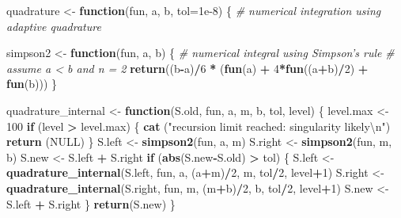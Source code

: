 \documentclass[]{book}
\newenvironment{Shaded}{\begin{snugshade}}{\end{snugshade}}
\newcommand{\KeywordTok}[1]{\textcolor[rgb]{0.13,0.29,0.53}{\textbf{#1}}}
\newcommand{\DataTypeTok}[1]{\textcolor[rgb]{0.13,0.29,0.53}{#1}}
\newcommand{\DecValTok}[1]{\textcolor[rgb]{0.00,0.00,0.81}{#1}}
\newcommand{\FloatTok}[1]{\textcolor[rgb]{0.00,0.00,0.81}{#1}}
\newcommand{\CharTok}[1]{\textcolor[rgb]{0.31,0.60,0.02}{#1}}
\newcommand{\StringTok}[1]{\textcolor[rgb]{0.31,0.60,0.02}{#1}}
\newcommand{\CommentTok}[1]{\textcolor[rgb]{0.56,0.35,0.01}{\textit{#1}}}
\newcommand{\OtherTok}[1]{\textcolor[rgb]{0.56,0.35,0.01}{#1}}
\newcommand{\ControlFlowTok}[1]{\textcolor[rgb]{0.13,0.29,0.53}{\textbf{#1}}}
\newcommand{\OperatorTok}[1]{\textcolor[rgb]{0.81,0.36,0.00}{\textbf{#1}}}
\newcommand{\NormalTok}[1]{#1}
\theoremstyle{definition}
\theoremstyle{definition}
\theoremstyle{definition}
\theoremstyle{remark}
\begin{document}
\begin{Shaded}
\begin{Highlighting}[]
\NormalTok{quadrature <-}\StringTok{ }\ControlFlowTok{function}\NormalTok{(fun, a, b, }\DataTypeTok{tol=}\FloatTok{1e-8}\NormalTok{) \{}
    \CommentTok{# numerical integration using adaptive quadrature}

\NormalTok{  simpson2 <-}\StringTok{ }\ControlFlowTok{function}\NormalTok{(fun, a, b) \{}
    \CommentTok{# numerical integral using Simpson's rule}
    \CommentTok{# assume a < b and n = 2}
    \KeywordTok{return}\NormalTok{((b}\OperatorTok{-}\NormalTok{a)}\OperatorTok{/}\DecValTok{6} \OperatorTok{*}\StringTok{ }\NormalTok{(}\KeywordTok{fun}\NormalTok{(a) }\OperatorTok{+}\StringTok{ }\DecValTok{4}\OperatorTok{*}\KeywordTok{fun}\NormalTok{((a}\OperatorTok{+}\NormalTok{b)}\OperatorTok{/}\DecValTok{2}\NormalTok{) }\OperatorTok{+}\StringTok{ }\KeywordTok{fun}\NormalTok{(b)))}
\NormalTok{  \}}
 
\NormalTok{    quadrature_internal <-}\StringTok{ }\ControlFlowTok{function}\NormalTok{(S.old, fun, a, m, b, tol, level) \{}
\NormalTok{        level.max <-}\StringTok{ }\DecValTok{100}
        \ControlFlowTok{if}\NormalTok{ (level }\OperatorTok{>}\StringTok{ }\NormalTok{level.max) \{}
            \KeywordTok{cat}\NormalTok{ (}\StringTok{"recursion limit reached: singularity likely}\CharTok{\textbackslash{}n}\StringTok{"}\NormalTok{)}
            \KeywordTok{return}\NormalTok{ (}\OtherTok{NULL}\NormalTok{)}
\NormalTok{        \}}
\NormalTok{        S.left <-}\StringTok{ }\KeywordTok{simpson2}\NormalTok{(fun, a, m) }
\NormalTok{        S.right <-}\StringTok{ }\KeywordTok{simpson2}\NormalTok{(fun, m, b)}
\NormalTok{        S.new <-}\StringTok{ }\NormalTok{S.left }\OperatorTok{+}\StringTok{ }\NormalTok{S.right}
        \ControlFlowTok{if}\NormalTok{ (}\KeywordTok{abs}\NormalTok{(S.new}\OperatorTok{-}\NormalTok{S.old) }\OperatorTok{>}\StringTok{ }\NormalTok{tol) \{}
\NormalTok{            S.left <-}\StringTok{ }\KeywordTok{quadrature_internal}\NormalTok{(S.left, fun, }
\NormalTok{                                          a, (a}\OperatorTok{+}\NormalTok{m)}\OperatorTok{/}\DecValTok{2}\NormalTok{, m, tol}\OperatorTok{/}\DecValTok{2}\NormalTok{, level}\OperatorTok{+}\DecValTok{1}\NormalTok{)}
\NormalTok{            S.right <-}\StringTok{ }\KeywordTok{quadrature_internal}\NormalTok{(S.right, fun, }
\NormalTok{                                           m, (m}\OperatorTok{+}\NormalTok{b)}\OperatorTok{/}\DecValTok{2}\NormalTok{, b, tol}\OperatorTok{/}\DecValTok{2}\NormalTok{, level}\OperatorTok{+}\DecValTok{1}\NormalTok{)}
\NormalTok{            S.new <-}\StringTok{ }\NormalTok{S.left }\OperatorTok{+}\StringTok{ }\NormalTok{S.right}
\NormalTok{        \}}
        \KeywordTok{return}\NormalTok{(S.new)}
\NormalTok{    \}}
 

\end{Highlighting}
\end{Shaded}
\end{document}
